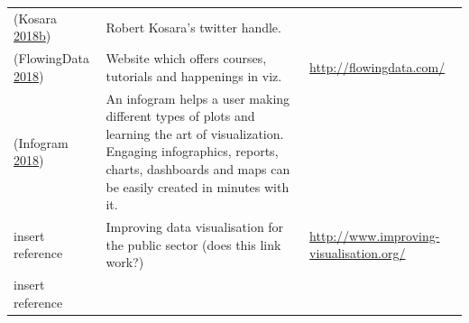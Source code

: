 \documentclass[]{book}
\begin{document}
\begin{longtable}[]{@{}lll@{}}
\begin{minipage}[t]{0.07\columnwidth}
(Kosara \protect\hyperlink{ref-twitter_Kosara}{2018}\protect\hyperlink{ref-twitter_Kosara}{b})\strut
\end{minipage} & \begin{minipage}[t]{0.77\columnwidth}\raggedright
Robert Kosara's twitter handle.\strut
\end{minipage} & \begin{minipage}[t]{0.07\columnwidth}\raggedright
\strut
\end{minipage}\tabularnewline
\begin{minipage}[t]{0.07\columnwidth}\raggedright
(FlowingData \protect\hyperlink{ref-flowingdata}{2018})\strut
\end{minipage} & \begin{minipage}[t]{0.77\columnwidth}\raggedright
Website which offers courses, tutorials and happenings in viz.\strut
\end{minipage} & \begin{minipage}[t]{0.07\columnwidth}\raggedright
\url{http://flowingdata.com/}\strut
\end{minipage}\tabularnewline
\begin{minipage}[t]{0.07\columnwidth}\raggedright
(Infogram \protect\hyperlink{ref-infogram}{2018})\strut
\end{minipage} & \begin{minipage}[t]{0.77\columnwidth}\raggedright
An infogram helps a user making different types of plots and learning the art of visualization. Engaging infographics, reports, charts, dashboards and maps can be easily created in minutes with it.\strut
\end{minipage} & \begin{minipage}[t]{0.07\columnwidth}\raggedright
\strut
\end{minipage}\tabularnewline
\begin{minipage}[t]{0.07\columnwidth}\raggedright
insert reference\strut
\end{minipage} & \begin{minipage}[t]{0.77\columnwidth}\raggedright
Improving data visualisation for the public sector (does this link work?)\strut
\end{minipage} & \begin{minipage}[t]{0.07\columnwidth}\raggedright
\url{http://www.improving-visualisation.org/}\strut
\end{minipage}\tabularnewline
\begin{minipage}[t]{0.07\columnwidth}\raggedright
insert reference\strut
\end{minipage} & \begin{minipage}[t]{0.77\columnwidth}\raggedright

\end{minipage}
\end{longtable}
\end{document}
